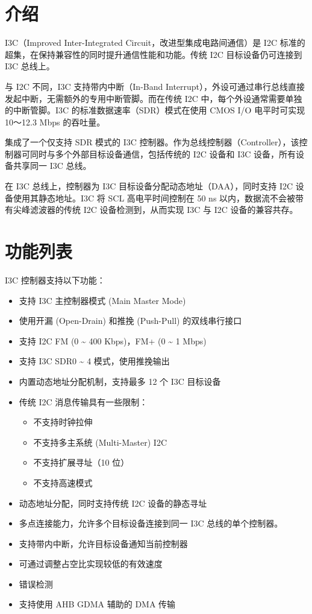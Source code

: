 \documentclass[main\_\_CN.tex]{subfiles}
\begin{document}
\section{介绍}

I3C（Improved Inter-Integrated Circuit，改进型集成电路间通信）是 I2C 标准的超集，在保持兼容性的同时提升通信性能和功能。传统 I2C 目标设备仍可连接到 I3C 总线上。

与 I2C 不同，I3C 支持带内中断（In-Band Interrupt），外设可通过串行总线直接发起中断，无需额外的专用中断管脚。而在传统 I2C 中，每个外设通常需要单独的中断管脚。I3C 的标准数据速率（SDR）模式在使用 CMOS I/O 电平时可实现 10～12.3 Mbps 的吞吐量。


\chipname{} 集成了一个仅支持 SDR 模式的 I3C 控制器。作为总线控制器（Controller），该控制器可同时与多个外部目标设备通信，包括传统的 I2C 设备和 I3C 设备，所有设备共享同一 I3C 总线。

在 I3C 总线上，控制器为 I3C 目标设备分配动态地址（DAA），同时支持 I2C 设备使用其静态地址。I3C 将 SCL 高电平时间控制在 50 ns 以内，数据流不会被带有尖峰滤波器的传统 I2C 设备检测到，从而实现 I3C 与 I2C 设备的兼容共存。



\vspace{2em}


\section{功能列表}
\label{sec:i3c-features}

I3C 控制器支持以下功能：
\begin{itemize}
    \item 支持 I3C 主控制器模式 (Main Master Mode)
    \item 使用开漏 (Open-Drain) 和推挽 (Push-Pull) 的双线串行接口
    \item 支持 I2C FM (0 \textasciitilde{} 400 Kbps)，FM+ (0 \textasciitilde{} 1 Mbps)
    \item 支持 I3C SDR0 \textasciitilde{} 4 模式，使用推挽输出
    \item 内置动态地址分配机制，支持最多 12 个 I3C 目标设备
    \item 传统 I2C 消息传输具有一些限制：
    \begin{itemize}
        \item 不支持时钟拉伸
        \item 不支持多主系统 (Multi-Master) I2C
        \item 不支持扩展寻址（10 位）
        \item 不支持高速模式
    \end{itemize}
    \item 动态地址分配，同时支持传统 I2C 设备的静态寻址
    \item 多点连接能力，允许多个目标设备连接到同一 I3C 总线的单个控制器。
    \item 支持带内中断，允许目标设备通知当前控制器
    \item 可通过调整占空比实现较低的有效速度
    \item 错误检测
    \item 支持使用 AHB GDMA 辅助的 DMA 传输
\end{itemize}
\end{document}
